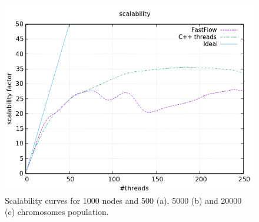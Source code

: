\documentclass[a4paper,10pt]{article}
\begin{document}
\begin{figure}[H]
			\begin{minipage}[t]{0.32\linewidth}
				\includegraphics[width=\linewidth]{BenchMarkTSP/scalability/1000/SC100020000_zoom.png}
				\subcaption{}
			\end{minipage}
			\caption{Scalability curves for 1000 nodes and 500 (a), 5000 (b) and 20000 (c) chromosomes population.}
			\label{1000s}
		\end{figure}
	
\end{document}
